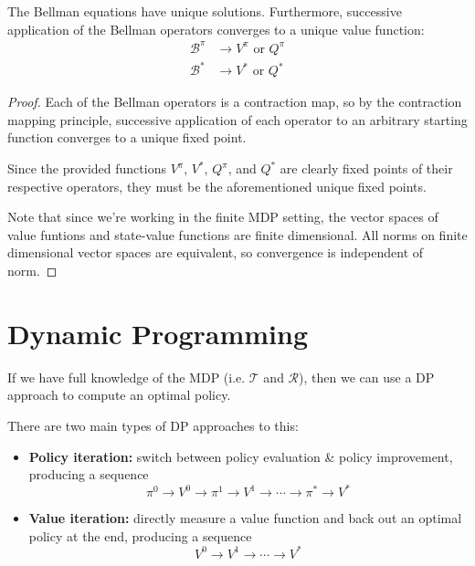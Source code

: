 \documentclass[twoside,10pt]{report}
\begin{document}
\begin{cor}
	\label{bellmanoperators}
	The Bellman equations have unique solutions. Furthermore, successive application of the Bellman operators converges to a unique value function:
\begin{align*}
	\mathcal{B}^{\pi} &\to V^{\pi} \text{ or } Q^{\pi} \\
	\mathcal{B}^{*} &\to V^{*} \text{ or } Q^{*}
\end{align*}
\end{cor}
\begin{proof}
	Each of the Bellman operators is a contraction map, so by the contraction mapping principle, successive application of each operator to an arbitrary starting function converges to a unique fixed point.

	Since the provided functions $V^{\pi}$, $V^{*}$, $Q^{\pi}$, and $Q^{*}$ are clearly fixed points of their respective operators, they must be the aforementioned unique fixed points.

	Note that since we're working in the finite MDP setting, the vector spaces of value funtions and state-value functions are finite dimensional. All norms on finite dimensional vector spaces are equivalent, so convergence is independent of norm.
\end{proof}


\section{Dynamic Programming}

If we have full knowledge of the MDP (i.e. $\mathcal{T}$ and $\mathcal{R}$), then we can use a DP approach to compute an optimal policy.

There are two main types of DP approaches to this:
\begin{itemize}
	\item \textbf{Policy iteration:} switch between policy evaluation \& policy improvement, producing a sequence
		\[
		\pi^{0} \to V^{0} \to \pi^{1}\to V^1 \to \cdots \to \pi^{*} \to V^{*}
		\] 
	\item \textbf{Value iteration:} directly measure a value function and back out an optimal policy at the end, producing a sequence
		\[
		V^{0} \to V^1 \to \cdots \to V^{*}
		\] 
\end{itemize}
\end{document}

